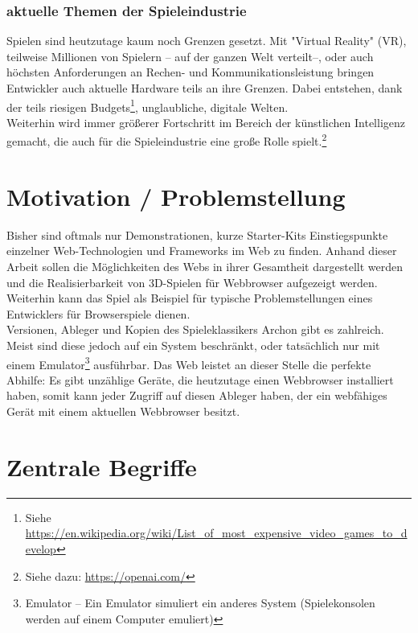 \subsubsection{aktuelle Themen der Spieleindustrie}
Spielen sind heutzutage kaum noch Grenzen gesetzt. Mit "Virtual Reality" (VR), teilweise Millionen von Spielern -- auf der ganzen Welt verteilt--, oder auch höchsten Anforderungen an Rechen- und Kommunikationsleistung bringen Entwickler auch aktuelle Hardware teils an ihre Grenzen. Dabei entstehen, dank der teils riesigen Budgets\footnote{Siehe \url{https://en.wikipedia.org/wiki/List_of_most_expensive_video_games_to_develop}}, unglaubliche, digitale Welten.\\
Weiterhin wird immer größerer Fortschritt im Bereich der künstlichen Intelligenz gemacht, die auch für die Spieleindustrie eine große Rolle spielt.\footnote{Siehe dazu: \url{https://openai.com/}}

\section{Motivation / Problemstellung}
\label{sec:motivation}

Bisher sind oftmals nur Demonstrationen, kurze Starter-Kits \bzw Einstiegspunkte einzelner Web-Technologien und Frameworks im Web zu finden. Anhand dieser Arbeit sollen die Möglichkeiten des Webs in ihrer Gesamtheit dargestellt werden und die Realisierbarkeit von 3D-Spielen für Webbrowser aufgezeigt werden. Weiterhin kann das Spiel als Beispiel für typische Problemstellungen eines Entwicklers für Browserspiele dienen.\\
Versionen, Ableger und Kopien des Spieleklassikers Archon gibt es zahlreich. Meist sind diese jedoch auf ein System beschränkt, oder tatsächlich nur mit einem Emulator\footnote{Emulator -- Ein Emulator simuliert ein anderes System (\zB Spielekonsolen werden auf einem Computer emuliert)} ausführbar. Das Web leistet an dieser Stelle die perfekte Abhilfe: Es gibt unzählige Geräte, die heutzutage einen Webbrowser installiert haben, somit kann jeder Zugriff auf diesen Ableger haben, der ein webfähiges Gerät mit einem aktuellen Webbrowser besitzt.
\clearpage
\section{Zentrale Begriffe}
\label{sec:zentrale_begriffe}
